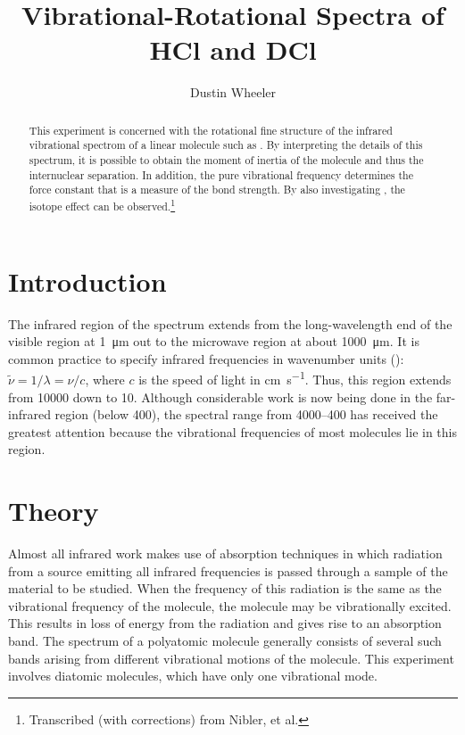 \documentclass[nobib,nofonts,nols,nohyper]{tufte-handout}
\title{Vibrational-Rotational Spectra of HCl and DCl}
\author{Dustin Wheeler}
\begin{document}
\maketitle%

\begin{abstract}
\noindent
This experiment is concerned with the rotational fine structure of the infrared vibrational spectrom of a linear molecule such as . By interpreting the details of this spectrum, it is possible to obtain the moment of inertia of the molecule and thus the internuclear separation. In addition, the pure vibrational frequency determines the force constant that is a measure of the bond strength. By also investigating , the isotope effect can be observed.\thanks{Transcribed (with corrections) from Nibler, et al.}
\end{abstract}

\section{Introduction} %
\label{sec:intro}

The infrared region of the spectrum extends from the long-wavelength end of the visible region at \SI{1}{\micro\m} out to the microwave region at about \SI{1000}{\micro\m}. 
It is common practice to specify infrared frequencies in wavenumber units (\si{\wn}): \( \widetilde{\nu} = 1/\lambda = \nu/c \), where \( c \) is the speed of light in \si{\cm \per \s}. 
Thus, this region extends from \SI{10000}{\wn} down to \SI{10}{\wn}. 
Although considerable work is now being done in the far-infrared region (below \SI{400}{\wn}), the spectral range from \SIrange{4000}{400}{\wn} has received the greatest attention because the vibrational frequencies of most molecules lie in this region. 


\section{Theory} %
\label{sec:theory}

Almost all infrared work makes use of absorption techniques in which radiation from a source emitting all infrared frequencies is passed through a sample of the material to be studied. 
When the frequency of this radiation is the same as the vibrational frequency of the molecule, the molecule may be vibrationally excited.
This results in loss of energy from the radiation and gives rise to an absorption band. 
The spectrum of a polyatomic molecule generally consists of several such bands arising from different vibrational motions of the molecule. 
This experiment involves diatomic molecules, which have only one vibrational mode. 
\end{document}
